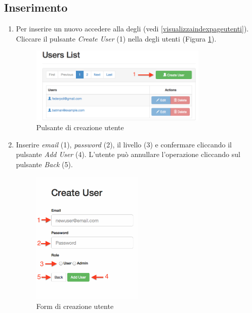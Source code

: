 	\clearpage
	\subsection{Inserimento} %
	\label{utenti-inserimento}
		\begin{enumerate}

			\item Per inserire un nuovo  accedere alla  degli  (vedi \ref{visualizzaindexpageutenti}). Cliccare il pulsante \emph{Create User} (1) nella  degli utenti (Figura \ref{fig:createuserButton}).
				\begin{figure}[H]
					\centering \includegraphics[width=0.8\textwidth]{img/createuserButton.png}
					\caption{ \label{fig:createuserButton} Pulsante di creazione utente}
				\end{figure}

			\item Inserire \emph{email} (1), \emph{password} (2), il livello  (3) e confermare cliccando il pulsante \emph{Add User} (4). L'utente può annullare l'operazione cliccando sul pulsante \emph{Back} (5).

				\begin{figure}[H]
					\centering \includegraphics[width=0.5\textwidth]{img/formCreazioneUtente.png}
					\caption{ \label{fig:formCreazioneUtente} Form di creazione utente}
				\end{figure}


\end{enumerate}
